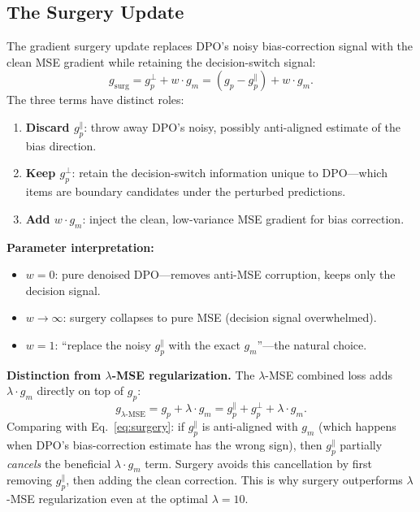 \documentclass[11pt]{article}
\begin{document}
\subsection{The Surgery Update}

The gradient surgery update replaces DPO's noisy bias-correction signal with
the clean MSE gradient while retaining the decision-switch signal:
\begin{equation}
  g_{\mathrm{surg}} = g_p^{\perp} + w \cdot g_m
    = \left(g_p - g_p^{\parallel}\right) + w \cdot g_m.
  \label{eq:surgery}
\end{equation}
The three terms have distinct roles:
\begin{enumerate}[itemsep=2pt]
  \item \textbf{Discard $g_p^{\parallel}$}: throw away DPO's noisy, possibly
        anti-aligned estimate of the bias direction.
  \item \textbf{Keep $g_p^{\perp}$}: retain the decision-switch information unique
        to DPO---which items are boundary candidates under the perturbed predictions.
  \item \textbf{Add $w \cdot g_m$}: inject the clean, low-variance MSE gradient
        for bias correction.
\end{enumerate}

\textbf{Parameter interpretation:}
\begin{itemize}[itemsep=2pt]
  \item $w = 0$: pure denoised DPO---removes anti-MSE corruption, keeps only the
        decision signal.
  \item $w \to \infty$: surgery collapses to pure MSE (decision signal overwhelmed).
  \item $w = 1$: ``replace the noisy $g_p^{\parallel}$ with the exact
        $g_m$''---the natural choice.
\end{itemize}

\textbf{Distinction from $\lambda$-MSE regularization.}
The $\lambda$-MSE combined loss adds $\lambda \cdot g_m$ directly on top of $g_p$:
\begin{equation}
  g_{\lambda\text{-MSE}} = g_p + \lambda \cdot g_m
    = g_p^{\parallel} + g_p^{\perp} + \lambda \cdot g_m.
  \label{eq:lam-mse}
\end{equation}
Comparing with Eq.~\eqref{eq:surgery}: if $g_p^{\parallel}$ is anti-aligned with
$g_m$ (which happens when DPO's bias-correction estimate has the wrong sign),
then $g_p^{\parallel}$ partially \emph{cancels} the beneficial $\lambda \cdot g_m$
term.  Surgery avoids this cancellation by first removing $g_p^{\parallel}$, then
adding the clean correction.  This is why surgery outperforms $\lambda$-MSE
regularization even at the optimal $\lambda = 10$.
\end{document}
